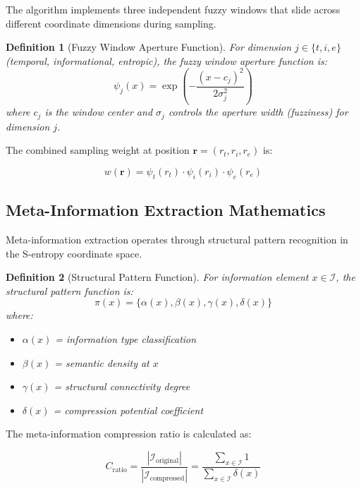 \documentclass[12pt,a4paper]{article}
\newtheorem{definition}{Definition}
\begin{document}
The algorithm implements three independent fuzzy windows that slide across different coordinate dimensions during sampling.

\begin{definition}[Fuzzy Window Aperture Function]
For dimension $j \in \{t, i, e\}$ (temporal, informational, entropic), the fuzzy window aperture function is:
\begin{equation}
\psi_j(x) = \exp\left(-\frac{(x - c_j)^2}{2\sigma_j^2}\right)
\end{equation}
where $c_j$ is the window center and $\sigma_j$ controls the aperture width (fuzziness) for dimension $j$.
\end{definition}

The combined sampling weight at position $\mathbf{r} = (r_t, r_i, r_e)$ is:

\begin{equation}
w(\mathbf{r}) = \psi_t(r_t) \cdot \psi_i(r_i) \cdot \psi_e(r_e)
\end{equation}

\subsection{Meta-Information Extraction Mathematics}

Meta-information extraction operates through structural pattern recognition in the S-entropy coordinate space.

\begin{definition}[Structural Pattern Function]
For information element $x \in \mathcal{I}$, the structural pattern function is:
\begin{equation}
\pi(x) = \{\alpha(x), \beta(x), \gamma(x), \delta(x)\}
\end{equation}
where:
\begin{itemize}
\item $\alpha(x)$ = information type classification
\item $\beta(x)$ = semantic density at $x$
\item $\gamma(x)$ = structural connectivity degree
\item $\delta(x)$ = compression potential coefficient
\end{itemize}
\end{definition}

The meta-information compression ratio is calculated as:

\begin{equation}
C_{\text{ratio}} = \frac{|\mathcal{I}_{\text{original}}|}{|\mathcal{I}_{\text{compressed}}|} = \frac{\sum_{x \in \mathcal{I}} 1}{\sum_{x \in \mathcal{I}} \delta(x)}
\end{equation}
\end{document}
